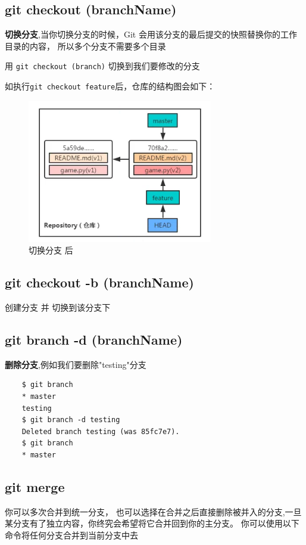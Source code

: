 \documentclass[UTF8,a4paper,12pt]{ctexbook}
\begin{document}
		  \subsection{git checkout (branchName)}
			  \textbf{切换分支},当你切换分支的时候，Git 会用该分支的最后提交的快照替换你的工作目录的内容， 所以多个分支不需要多个目录
		  
			  用 \verb|git checkout (branch)| 切换到我们要修改的分支

			  如执行\verb|git checkout feature|后，仓库的结构图会如下：
			  
				\begin{figure}[htbp]
					\centering
					\includegraphics[scale = 0.7]{figure/branchCheck.png}
					\caption{切换分支 后}
				\end{figure}  
		
		  \subsection{git checkout -b (branchName)}
			  创建分支 并 切换到该分支下
			  
		  \subsection{git branch -d (branchName)}
			 \textbf{删除分支},例如我们要删除"testing"分支
			  
			  \begin{lstlisting}
	$ git branch
	* master
	testing
	$ git branch -d testing
	Deleted branch testing (was 85fc7e7).
	$ git branch
	* master
			  \end{lstlisting}
		  \subsection{git merge}
			  你可以多次合并到统一分支， 也可以选择在合并之后直接删除被并入的分支,一旦某分支有了独立内容，你终究会希望将它合并回到你的主分支。 你可以使用以下命令将任何分支合并到当前分支中去
			  
\end{document}
